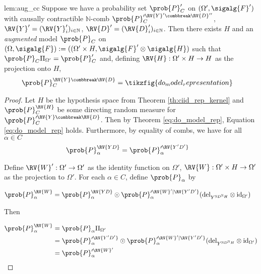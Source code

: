 \begin{replemma}{lem:aug_cc}
Suppose we have a probability set $\prob{P}_C'$ on $(\Omega',\sigalg{F}')$ with causally contractible $\mathbb{N}$-comb $\prob{P}_C^{\prime \RV{Y}'\combbreak \RV{D}''}$, $\RV{Y}'=(\RV{Y}'_i)_{i\in\mathbb{N}}$, $\RV{D}'=(\RV{D}'_i)_{i\in\mathbb{N}}$. Then there exists $H$ and an \emph{augmented} model $\prob{P}_C$ on $(\Omega,\sigalg{F}):=((\Omega'\times H,\sigalg{F}'\otimes\sigalg{H})$ such that $\prob{P}_C\Pi_{\Omega'}=\prob{P}_C'$ and, defining $\RV{H}:\Omega'\times H\to H$ as the projection onto $H$,
\begin{align}
    \prob{P}_C^{\RV{Y}\combbreak \RV{D}} &= \tikzfig{do_model_representation}\label{eq:do_model_rep}
\end{align}
\end{replemma}

\begin{proof}
Let $H$ be the hypothesis space from Theorem \ref{th:ciid_rep_kernel} and $\prob{P}_C^{\RV{H}}$ be some directing random measure for $\prob{P}_C^{\prime \RV{Y}\combbreak \RV{D}}$. Then by Theorem \ref{eq:do_model_rep}, Equation \ref{eq:do_model_rep} holds. Furthermore, by equality of combs, we have for all $\alpha\in C$
\begin{align}
	\prob{P}_\alpha^{\RV{YD}} &= \prob{P}_\alpha^{\prime \RV{Y'D'}}
\end{align}

Define $\RV{W}':\Omega'\to \Omega'$ as the identity function on $\Omega'$, $\RV{W}:\Omega'\times H\to \Omega'$ as the projection to $\Omega'$. For each $\alpha\in C$, define $\prob{P}_\alpha$ by

\begin{align}
	\prob{P}_\alpha^{\RV{W}} &= \prob{P}_\alpha^{\RV{YD}}\odot \prob{P}_\alpha^{\prime \RV{W}'|\RV{Y'D'}} (\mathrm{del}_{Y^{\mathbb{N}D^{\mathbb{N}}H}}\otimes \mathrm{id}_{\Omega'})
\end{align}

Then

\begin{align}
	\prob{P}_\alpha^{\RV{W}} &= \prob{P}_\alpha\Pi_{\Omega'}\\
	&= \prob{P}_\alpha^{\prime \RV{Y'D'}}\odot \prob{P}_\alpha^{\prime \RV{W}'|\RV{Y'D'}}(\mathrm{del}_{Y^{\mathbb{N}D^{\mathbb{N}}H}}\otimes \mathrm{id}_{\Omega'})\\
	&= \prob{P}_\alpha^{\prime \RV{W}'}
\end{align}
\end{proof}